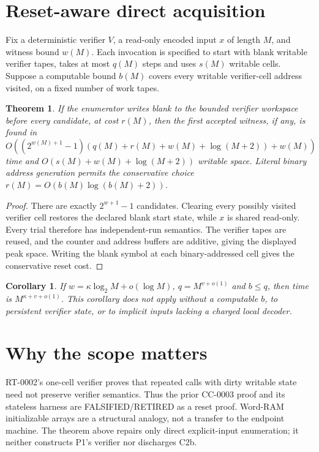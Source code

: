 \documentclass[11pt]{article}
\newtheorem{theorem}{Theorem}
\newtheorem{corollary}{Corollary}
\begin{document}
\section*{Reset-aware direct acquisition}
Fix a deterministic verifier $V$, a read-only encoded input $x$ of length $M$,
and witness bound $w(M)$.  Each invocation is specified to start with blank
writable verifier tapes, takes at most $q(M)$ steps and uses $s(M)$ writable
cells.  Suppose a computable bound $b(M)$ covers every writable verifier-cell
address visited, on a fixed number of work tapes.

\begin{theorem}
If the enumerator writes blank to the bounded verifier workspace before every
candidate, at cost $r(M)$, then the first accepted witness, if any, is found in
\[
 O\!\left((2^{w(M)+1}-1)
 (q(M)+r(M)+w(M)+\log(M+2))+w(M)\right)
\]
time and $O(s(M)+w(M)+\log(M+2))$ writable space.  Literal binary address
generation permits the conservative choice
$r(M)=O(b(M)\log(b(M)+2))$.
\end{theorem}
\begin{proof}
There are exactly $2^{w+1}-1$ candidates.  Clearing every possibly visited
verifier cell restores the declared blank start state, while $x$ is shared
read-only.  Every trial therefore has independent-run semantics.  The verifier
tapes are reused, and the counter and address buffers are additive, giving the
displayed peak space.  Writing the blank symbol at each binary-addressed cell
gives the conservative reset cost.
\end{proof}

\begin{corollary}
If $w=\kappa\log_2M+o(\log M)$, $q=M^{v+o(1)}$ and $b\le q$, then time is
$M^{\kappa+v+o(1)}$.  This corollary does not apply without a computable $b$,
to persistent verifier state, or to implicit inputs lacking a charged local
decoder.
\end{corollary}

\section*{Why the scope matters}
RT-0002's one-cell verifier proves that repeated calls with dirty writable
state need not preserve verifier semantics.  Thus the prior CC-0003 proof and
its stateless harness are FALSIFIED/RETIRED as a reset proof.  Word-RAM
initializable arrays are a structural analogy, not a transfer to the endpoint
machine.  The theorem above repairs only direct explicit-input enumeration;
it neither constructs P1's verifier nor discharges C2b.
\end{document}
